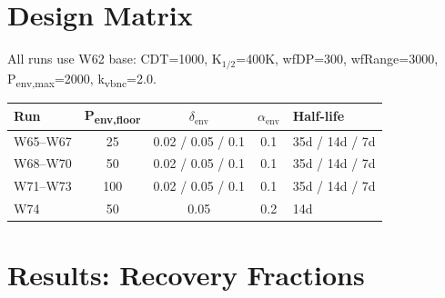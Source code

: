 \documentclass[11pt]{article}
\begin{document}
\section{Design Matrix}

All runs use W62 base: CDT=1000, K$_{1/2}$=400K, wfDP=300, wfRange=3000, P\textsubscript{env,max}=2000, k\textsubscript{vbnc}=2.0.

\begin{table}[H]
\centering
\begin{tabular}{lcccl}
\toprule
Run & P\textsubscript{env,floor} & $\delta_\text{env}$ & $\alpha_\text{env}$ & Half-life \\
\midrule
W65--W67 & 25 & 0.02 / 0.05 / 0.1 & 0.1 & 35d / 14d / 7d \\
W68--W70 & 50 & 0.02 / 0.05 / 0.1 & 0.1 & 35d / 14d / 7d \\
W71--W73 & 100 & 0.02 / 0.05 / 0.1 & 0.1 & 35d / 14d / 7d \\
W74 & 50 & 0.05 & 0.2 & 14d \\
\bottomrule
\end{tabular}
\end{table}

\section{Results: Recovery Fractions}
\end{document}
